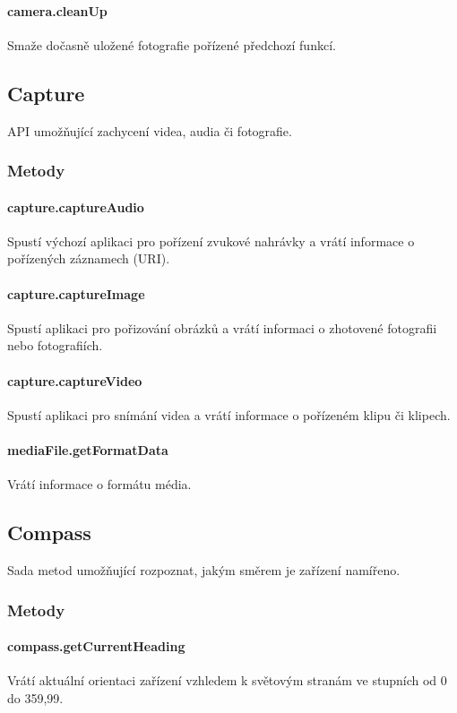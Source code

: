 \paragraph{camera.cleanUp}
Smaže dočasně uložené fotografie pořízené předchozí funkcí.

\subsection{Capture}
API umožňující zachycení videa, audia či fotografie.

\subsubsection{Metody}
\paragraph{capture.captureAudio}
Spustí výchozí aplikaci pro pořízení zvukové nahrávky a vrátí informace o pořízených záznamech (URI).

\paragraph{capture.captureImage}
Spustí aplikaci pro pořizování obrázků a vrátí informaci o zhotovené fotografii nebo fotografiích.

\paragraph{capture.captureVideo}
Spustí aplikaci pro snímání videa a vrátí informace o pořízeném klipu či klipech.

\paragraph{mediaFile.getFormatData}
Vrátí informace o formátu média.

\subsection{Compass}
Sada metod umožňující rozpoznat, jakým směrem je zařízení namířeno.

\subsubsection{Metody}
\paragraph{compass.getCurrentHeading}
Vrátí aktuální orientaci zařízení vzhledem k světovým stranám ve stupních od 0 do 359,99.

